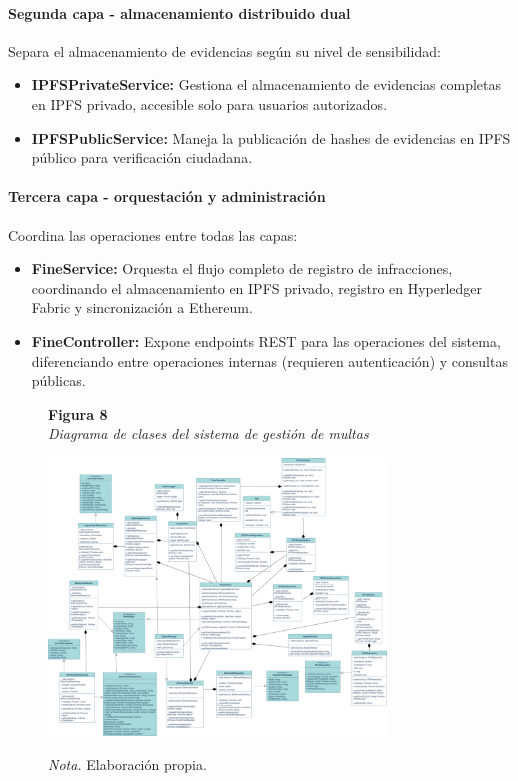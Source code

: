 \paragraph{Segunda capa - almacenamiento distribuido dual}
Separa el almacenamiento de evidencias según su nivel de sensibilidad:
\begin{itemize}
    \item \textbf{IPFSPrivateService:} Gestiona el almacenamiento de evidencias completas en IPFS privado, accesible solo para usuarios autorizados.
    \item \textbf{IPFSPublicService:} Maneja la publicación de hashes de evidencias en IPFS público para verificación ciudadana.
\end{itemize}

\paragraph{Tercera capa - orquestación y administración}
Coordina las operaciones entre todas las capas:
\begin{itemize}
    \item \textbf{FineService:} Orquesta el flujo completo de registro de infracciones, coordinando el almacenamiento en IPFS privado, registro en Hyperledger Fabric y sincronización a Ethereum.
    \item \textbf{FineController:} Expone endpoints REST para las operaciones del sistema, diferenciando entre operaciones internas (requieren autenticación) y consultas públicas.
\end{itemize} 
 \begin{figure}[htbp]
    \begin{flushleft}
        \textbf{Figura 8}\\[2em]
        \textit{Diagrama de clases del sistema de gestión de multas}
    \end{flushleft}
    \vspace{1em}
    \centering
    \includegraphics[width=0.8\textwidth]{Images/uml.png}
    \vspace{2em}
    \begin{flushleft}
        \textit{Nota.} Elaboración propia.
    \end{flushleft}
    \label{fig:diagrama_clases}
\end{figure}
